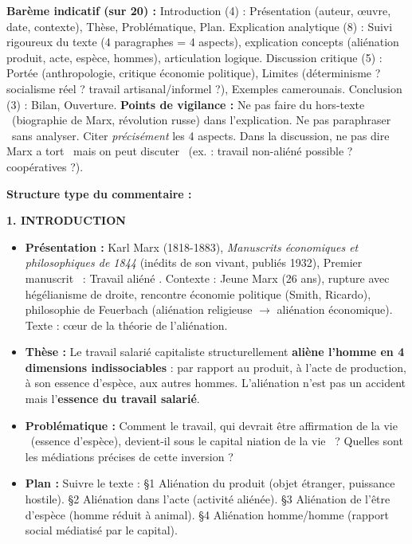 \documentclass[11pt]{article}
\begin{document}
\begin{corrige}
\textbf{Barème indicatif (sur 20) :} Introduction (4) : Présentation (auteur, œuvre, date, contexte), Thèse, Problématique, Plan. Explication analytique (8) : Suivi rigoureux du texte (4 paragraphes = 4 aspects), explication concepts (aliénation produit, acte, espèce, hommes), articulation logique. Discussion critique (5) : Portée (anthropologie, critique économie politique), Limites (déterminisme ? socialisme réel ? travail artisanal/informel ?), Exemples camerounais. Conclusion (3) : Bilan, Ouverture. \textbf{Points de vigilance :} Ne pas faire du \guillemotleft hors-texte \guillemotright\ (biographie de Marx, révolution russe) dans l'explication. Ne pas \guillemotleft paraphraser \guillemotright\ sans analyser. Citer \emph{précisément} les 4 aspects. Dans la discussion, ne pas dire \guillemotleft Marx a tort \guillemotright\ mais \guillemotleft on peut discuter \guillemotright\ (ex. : travail non-aliéné possible ? coopératives ?).

\textbf{Structure type du commentaire :}

\textbf{1. INTRODUCTION}
\begin{itemize}
\item \textbf{Présentation :} Karl Marx (1818-1883), \emph{Manuscrits économiques et philosophiques de 1844} (inédits de son vivant, publiés 1932), \guillemotleft Premier manuscrit \guillemotright\ : \guillemotleft Travail aliéné \guillemotright. Contexte : Jeune Marx (26 ans), rupture avec hégélianisme de droite, rencontre économie politique (Smith, Ricardo), philosophie de Feuerbach (aliénation religieuse $\rightarrow$ aliénation économique). Texte : cœur de la théorie de l'aliénation.
\item \textbf{Thèse :} Le travail salarié capitaliste structurellement \textbf{aliène l'homme en 4 dimensions indissociables} : par rapport au produit, à l'acte de production, à son essence d'espèce, aux autres hommes. L'aliénation n'est pas un accident mais l'\textbf{essence du travail salarié}.
\item \textbf{Problématique :} Comment le travail, qui devrait être \guillemotleft affirmation de la vie \guillemotright\ (essence d'espèce), devient-il sous le capital \guillemotleft niation de la vie \guillemotright\ ? Quelles sont les médiations précises de cette inversion ?
\item \textbf{Plan :} Suivre le texte : §1 Aliénation du produit (objet étranger, puissance hostile). §2 Aliénation dans l'acte (activité aliénée). §3 Aliénation de l'être d'espèce (homme réduit à animal). §4 Aliénation homme/homme (rapport social médiatisé par le capital).
\end{itemize}


\end{corrige}
\end{document}
